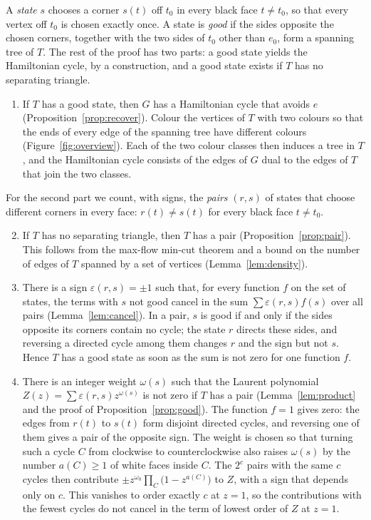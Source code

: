 \documentclass[a4paper]{amsart}
\numberwithin{equation}{section}
\theoremstyle{definition}
\newcommand{\eps}{\varepsilon}
\begin{document}
A \emph{state} $s$ chooses a corner $s(t)$ off $t_0$ in every black face $t\neq t_0$, so that every vertex off $t_0$ is chosen exactly once.
A state is \emph{good} if the sides opposite the chosen corners, together with the two sides of $t_0$ other than $e_0$, form a spanning tree of $T$.
The rest of the proof has two parts: a good state yields the Hamiltonian cycle, by a construction, and a good state exists if $T$ has no separating triangle.
\begin{enumerate}
\item\label{step:cycle}
If $T$ has a good state, then $G$ has a Hamiltonian cycle that avoids $e$ (Proposition~\ref{prop:recover}).
Colour the vertices of $T$ with two colours so that the ends of every edge of the spanning tree have different colours (Figure~\ref{fig:overview}).
Each of the two colour classes then induces a tree in $T$, and the Hamiltonian cycle consists of the edges of $G$ dual to the edges of $T$ that join the two classes.
\end{enumerate}
For the second part we count, with signs, the \emph{pairs} $(r,s)$ of states that choose different corners in every face: $r(t)\neq s(t)$ for every black face $t\neq t_0$.
\begin{enumerate}\setcounter{enumi}{1}
\item\label{step:pair}
If $T$ has no separating triangle, then $T$ has a pair (Proposition~\ref{prop:pair}).
This follows from the max-flow min-cut theorem and a bound on the number of edges of $T$ spanned by a set of vertices (Lemma~\ref{lem:density}).
\item\label{step:cancel}
There is a sign $\eps(r,s)=\pm1$ such that, for every function $f$ on the set of states, the terms with $s$ not good cancel in the sum $\sum\eps(r,s)f(s)$ over all pairs (Lemma~\ref{lem:cancel}).
In a pair, $s$ is good if and only if the sides opposite its corners contain no cycle; the state $r$ directs these sides, and reversing a directed cycle among them changes $r$ and the sign but not $s$.
Hence $T$ has a good state as soon as the sum is not zero for one function $f$.
\item\label{step:count}
There is an integer weight $\omega(s)$ such that the Laurent polynomial $Z(z)=\sum\eps(r,s)z^{\omega(s)}$ is not zero if $T$ has a pair (Lemma~\ref{lem:product} and the proof of Proposition~\ref{prop:good}).
The function $f=1$ gives zero: the edges from $r(t)$ to $s(t)$ form disjoint directed cycles, and reversing one of them gives a pair of the opposite sign.
The weight is chosen so that turning such a cycle $C$ from clockwise to counterclockwise also raises $\omega(s)$ by the number $a(C)\ge1$ of white faces inside $C$.
The $2^c$ pairs with the same $c$ cycles then contribute $\pm z^{\omega_0}\prod_C\bigl(1-z^{a(C)}\bigr)$ to $Z$, with a sign that depends only on $c$.
This vanishes to order exactly $c$ at $z=1$, so the contributions with the fewest cycles do not cancel in the term of lowest order of $Z$ at $z=1$.
\end{enumerate}
\end{document}
